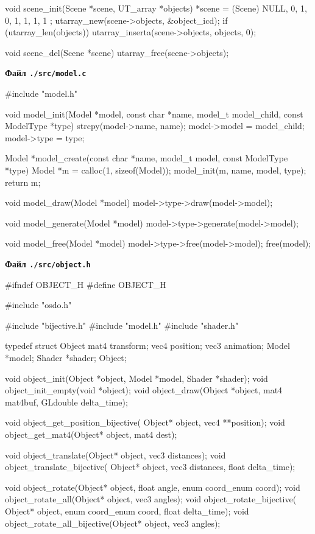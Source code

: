 \documentclass[14pt,a4paper]{extarticle}
\theoremstyle{definition}
\renewcommand{\[}{\begin{singlespace}\begin{equation*}}
\renewcommand{\]}{\end{equation*}\end{singlespace}}
\begin{document}
\begin{multicols}{2}
\begin{ccode}
void scene_init(Scene *scene, UT_array *objects) {
    *scene = (Scene){
        NULL, 0, 1, 0, 1, 1, 1, 1
    };
    utarray_new(scene->objects, &object_icd);
    if (utarray_len(objects))
        utarray_inserta(scene->objects, objects, 0);
}

void scene_del(Scene *scene) {
    utarray_free(scene->objects);
}
\end{ccode}
\noindent\cprotect\textbf{Файл \verb+./src/model.c+}
\begin{ccode}
#include "model.h"

void model_init(Model *model, const char *name, model_t model_child, const ModelType *type) {
    strcpy(model->name, name);
    model->model = model_child;
    model->type = type;
}

Model *model_create(const char *name, model_t model, const ModelType *type) {
    Model *m = calloc(1, sizeof(Model));
    model_init(m, name, model, type);
    return m;
}

void model_draw(Model *model) {
    model->type->draw(model->model);
}

void model_generate(Model *model) {
    model->type->generate(model->model);
}

void model_free(Model *model) {
    model->type->free(model->model);
    free(model);
}
\end{ccode}
\noindent\cprotect\textbf{Файл \verb+./src/object.h+}
\begin{ccode}
#ifndef OBJECT_H
#define OBJECT_H

#include "osdo.h"

#include "bijective.h"
#include "model.h"
#include "shader.h"

typedef struct Object {
    mat4 transform;
    vec4 position;
    vec3 animation;
    Model *model;
    Shader *shader;
} Object;

void object_init(Object *object, Model *model, Shader *shader);
void object_init_empty(void *object);
void object_draw(Object *object, mat4 mat4buf, GLdouble delta_time);

void object_get_position_bijective(
        Object* object, vec4 **position);
void object_get_mat4(Object* object, mat4 dest);

void object_translate(Object* object, vec3 distances);
void object_translate_bijective(
        Object* object, vec3 distances, float delta_time);

void object_rotate(Object* object, float angle, enum coord_enum coord);
void object_rotate_all(Object* object, vec3 angles);
void object_rotate_bijective(
        Object* object, enum coord_enum coord, float delta_time);
void object_rotate_all_bijective(Object* object, vec3 angles);


\end{ccode}
\end{multicols}
\end{document}
